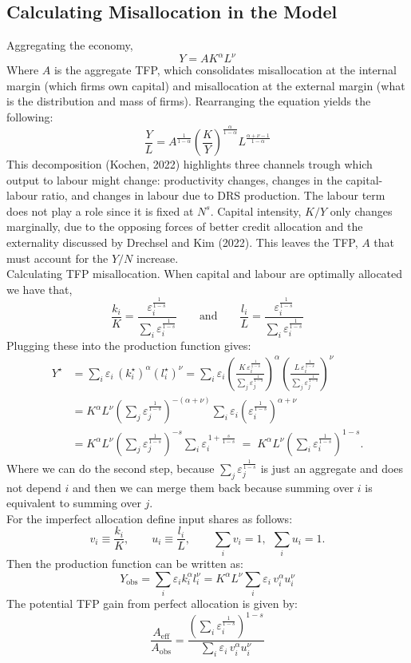 \documentclass[12pt]{article}
\begin{document}
\subsection*{Calculating Misallocation in the Model}
Aggregating the economy, 
$$ Y = AK^{\alpha}L^{\nu}  $$
Where $A$ is the aggregate TFP, which consolidates misallocation at the internal margin (which firms own capital) and misallocation at the external margin (what is the distribution and mass of firms). Rearranging the equation yields the following: 
$$ \frac{Y}{L} = A^\frac{1}{1-\alpha} \left( \frac{K}{Y} \right)^\frac{\alpha}{1-\alpha} L^\frac{\alpha + \nu - 1}{1-\alpha} $$
This decomposition (Kochen, 2022) highlights three channels trough which output to labour might change: productivity changes, changes in the capital-labour ratio, and changes in labour due to DRS production. The labour term does not play a role since it is fixed at $N^s$. Capital intensity, $K/Y$ only changes marginally, due to the opposing forces of better credit allocation and the externality discussed by Drechsel and Kim (2022). This leaves the TFP, $A$ that must account for the $Y/N$ increase. \vspace{3mm} \\
Calculating TFP misallocation. When capital and labour are optimally allocated we have that, $$ \frac{k_i}{K} =  \frac{ \varepsilon_i^{\frac{1}{1-s}}}{\sum_i \varepsilon_i^{\frac{1}{1-s}}}  \qquad \text{and}  \qquad \frac{l_i}{L} =  \frac{ \varepsilon_i^{\frac{1}{1-s}}}{\sum_i \varepsilon_i^{\frac{1}{1-s}}}  $$
Plugging these into the production function gives:
$$
\begin{aligned}
Y^\star
&= \sum_i \varepsilon_i\,(k_i^\star)^{\alpha}(l_i^\star)^{\nu}
= \sum_i \varepsilon_i
\left(\frac{K\,\varepsilon_i^{\frac{1}{1-s}}}{\sum_j \varepsilon_j^{\frac{1}{1-s}}}\right)^{\!\alpha}
\left(\frac{L\,\varepsilon_i^{\frac{1}{1-s}}}{\sum_j \varepsilon_j^{\frac{1}{1-s}}}\right)^{\!\nu} \\[4pt]
&= K^{\alpha}L^{\nu}
\left(\sum_j \varepsilon_j^{\frac{1}{1-s}}\right)^{-(\alpha+\nu)}
\sum_i \varepsilon_i
\left(\varepsilon_i^{\frac{1}{1-s}}\right)^{\!\alpha+\nu} \\[4pt]
&= K^{\alpha}L^{\nu}
\left(\sum_j \varepsilon_j^{\frac{1}{1-s}}\right)^{-s}
\sum_i \varepsilon_i^{\,1+\frac{s}{1-s}}
\;=\;
K^{\alpha}L^{\nu}
\left(\sum_i \varepsilon_i^{\frac{1}{1-s}}\right)^{1-s}.
\end{aligned}
$$
Where we can do the second step, because $ \sum_j \varepsilon_j^{\frac{1}{1-s}} $ is just an aggregate and does not depend $i$ and then we can merge them back because summing over $i$ is equivalent to summing over $j$. \vspace{3mm} \\
For the imperfect allocation define input shares as follows:
$$ v_i \equiv \frac{k_i}{K},\qquad u_i \equiv \frac{l_i}{L},\qquad \sum_i v_i=1,\ \ \sum_i u_i=1. $$
Then the production function can be written as:
$$ Y_{\text{obs}}=\sum_i \varepsilon_i k_i^{\alpha} l_i^{\nu} = K^{\alpha} L^{\nu} \sum_i \varepsilon_i\, v_i^{\alpha} u_i^{\nu} $$
The potential TFP gain from perfect allocation is given by: 
$$ \frac{A_{\text{eff}}}{A_{\text{obs}}} = \frac{\left(\sum_i \varepsilon_i^{\frac{1}{1-s}}\right)^{1-s}}{\sum_i \varepsilon_i\, v_i^{\alpha} u_i^{\nu}} $$
\end{document}
